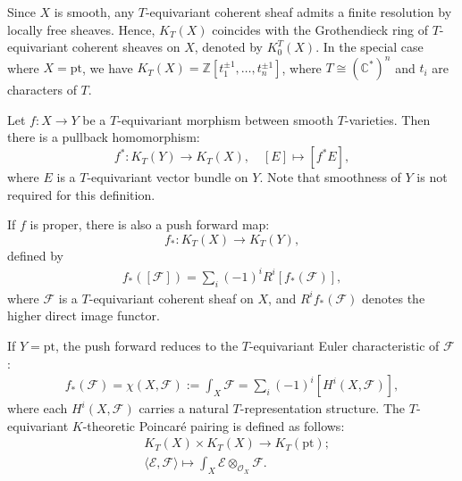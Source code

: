 \documentclass{amsart}
\begin{document}
Since $X$ is smooth, any $T$-equivariant coherent sheaf admits a finite resolution by locally free sheaves. Hence, $K_T(X)$ coincides with the Grothendieck ring of $T$-equivariant coherent sheaves on $X$, denoted by $K_0^T(X).$
In the special case where $X=\mathrm{pt}$, we have $K_T(X) = \mathbb{Z}[{t_1^{\pm 1}},\dots,{t_n^{\pm 1}}]$, where $T \cong (\mathbb{C}^*)^n$ and ${t_i}$ are characters of $T$.

Let $f : X \to Y$ be a $T$-equivariant morphism between smooth $T$-varieties. Then there is a pullback homomorphism:
\[
f^*: K_T(Y) \to K_T(X), \quad [E] \mapsto [f^*E],
\]
where $E$ is a $T$-equivariant vector bundle on $Y$. Note that smoothness of $Y$ is not required for this definition.
 
 If $f$ is proper, there is also a push forward map:  
 \[
 f_*:K_T(X) \to K_T(Y),
 \]
 defined by
\begin{align*}
f_*([\mathcal{F}]) = \sum_i (-1)^iR^i [f_*(\mathcal{F})],
\end{align*}
where $\mathcal{F}$ is a $T$-equivariant coherent sheaf on $X$, and $R^if_*(\mathcal{F})$ denotes the higher direct image functor.

If $Y = \mathrm{pt}$, the push forward reduces to the $T$-equivariant Euler characteristic of $\mathcal{F}$:
\begin{align*}
    f_*(\mathcal{F}) = \chi(X,\mathcal{F}) := \int_X \mathcal{F} = \sum_i (-1)^i[H^i(X,\mathcal{F})] ,
\end{align*}
where each $H^i(X,\mathcal{F})$ carries a natural $T$-representation structure.
The $T$-equivariant $K$-theoretic Poincar\'e pairing is defined as follows:
\begin{align*}
    &K_T(X) \times K_T(X) \to K_T(\mathrm{pt}); \\&
    \langle\mathcal{E} , \mathcal{F}\rangle \mapsto \int_X \mathcal{E} \otimes_{\mathcal{O}_X} \mathcal{F}.
\end{align*}
\end{document}
